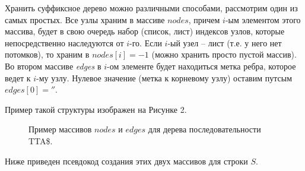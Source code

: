 \documentclass[letterpaper, 11pt]{article}
\begin{document}
Хранить суффиксное дерево можно различными способами, рассмотрим один из самых простых. Все узлы храним в массиве $nodes$, причем $i$-ым элементом этого массива, будет в свою очередь набор (список, лист) индексов узлов, которые непосредственно наследуются от $i$-го. Если $i$-ый узел -- лист (т.е. у него нет потомков), то храним в $nodes[i] = -1$ (можно хранить просто пустой массив). Во втором массиве \textit{edges} в $i$-ом элементе будет находиться метка ребра, которое ведет к $i$-му узлу. Нулевое значение (метка к корневому узлу) оставим путсым $edges[0] = ''$.

Пример такой структуры изображен на Рисунке 2.

\begin{figure}[H]
  \caption{Пример массивов $nodes$ и $edges$ для дерева последовательности TTA\$.}
\end{figure}

Ниже приведен псевдокод создания этих двух массивов для строки $S$.
\end{document}
